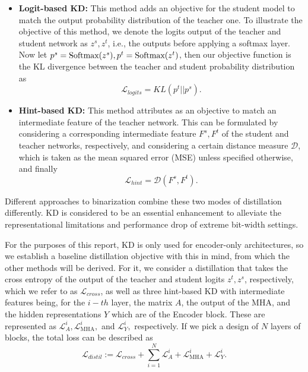 \begin{itemize}
    \item \textbf{Logit-based KD:} This method adds an objective for the student model to match the output probability distribution of the teacher one. To illustrate the objective of this method, we denote the logits output of the teacher and student network as $z^s, z^t$, i.e., the outputs before applying a softmax layer. Now let $p^s = \text{Softmax}(z^s), p^t = \text{Softmax}(z^t)$, then our objective function is the KL divergence between the teacher and student probability distribution as
    \begin{equation}
        \mathcal{L}_{logits} = KL ( p^t || p^s).
    \end{equation}

    \item \textbf{Hint-based KD:} This method attributes as an objective to match an intermediate feature of the teacher network. This can be formulated by considering a corresponding intermediate feature $F^s, F^t$ of the student and teacher networks, respectively, and considering a certain distance measure $\mathcal{D}$, which is taken as the mean squared error (MSE) unless specified otherwise, and finally
    \begin{equation}
        \mathcal{L}_{hint} = \mathcal{D}(F^s, F^t).
    \end{equation}
\end{itemize}

Different approaches to binarization combine these two modes of distillation differently. KD is considered to be an essential enhancement to alleviate the representational limitations and performance drop of extreme bit-width settings. 

For the purposes of this report, KD is only used for encoder-only architectures, so we establish a baseline distillation objective with this in mind, from which the other methods will be derived. For it, we consider a distillation that takes the cross entropy of the output of the teacher and student logits $z^t, z^s$, respectively, which we refer to as $\mathcal{L}_{cross}$, as well as three hint-based KD with intermediate features being, for the $i-th$ layer, the matrix $A$, the output of the MHA, and the hidden representations $Y$ which are of the Encoder block. These are represented as $\mathcal{L}^i_{A}, \mathcal{L}^i_{\text{MHA}}, $ and $ \mathcal{L}^i_{Y},$ respectively.
If we pick a design of $N$ layers of blocks, the total loss can be described as
\begin{equation}
    \mathcal{L}_{distil} := \mathcal{L}_{cross} + \sum_{i=1}^N \mathcal{L}^i_{A} + \mathcal{L}^i_{\text{MHA}} + \mathcal{L}^i_{Y}.
\end{equation}

